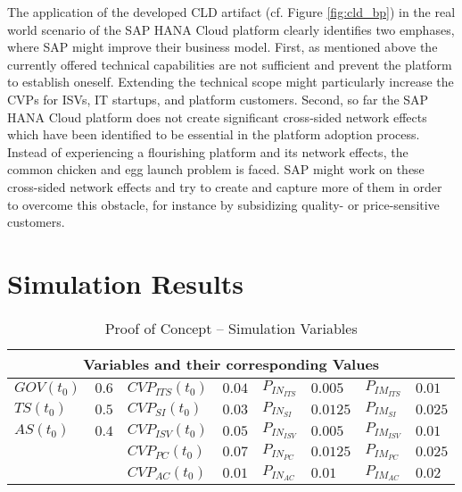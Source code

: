 The application of the developed \ac{CLD} artifact (cf. Figure \ref{fig:cld_bp}) in the real world scenario of the SAP HANA Cloud platform clearly identifies two emphases, where SAP might improve their business model. First, as mentioned above the currently offered technical capabilities are not sufficient and prevent the platform to establish oneself. Extending the technical scope might particularly increase the \acp{CVP} for \acp{ISV}, \ac{IT} startups, and platform customers. Second, so far the SAP HANA Cloud platform does not create significant cross-sided network effects which have been identified to be essential in the platform adoption process. Instead of experiencing a flourishing platform and its network effects, the common chicken and egg launch problem is faced. SAP might work on these cross-sided network effects and try to create and capture more of them in order to overcome this obstacle, for instance by subsidizing quality- or price-sensitive customers.

\section{Simulation Results}\label{ch:poc:sr}



\begin{table}[t]
	\centering
	\begin{tabular}{llllllll}
		\toprule 
		\multicolumn{8}{c}{\footnotesize \textbf{Variables and their corresponding Values}} \\ \midrule
		\footnotesize $GOV(t_0)$ & \footnotesize $0.6$ & \footnotesize $CVP_{ITS}(t_0)$ & \footnotesize $0.04$ & \footnotesize $P_{IN_{ITS}}$ & \footnotesize $0.005$ & \footnotesize $P_{IM_{ITS}}$ & \footnotesize $0.01$ \\
		\footnotesize $TS(t_0)$ & \footnotesize $0.5$ & \footnotesize $CVP_{SI}(t_0)$ & \footnotesize $0.03$ & \footnotesize $P_{IN_{SI}}$ & \footnotesize $0.0125$ & \footnotesize $P_{IM_{SI}}$ & \footnotesize $0.025$ \\
		\footnotesize $AS(t_0)$ & \footnotesize $0.4$ & \footnotesize $CVP_{ISV}(t_0)$ & \footnotesize $0.05$ & \footnotesize $P_{IN_{ISV}}$ & \footnotesize $0.005$ & \footnotesize $P_{IM_{ISV}}$ & \footnotesize $0.01$ \\
		& & \footnotesize $CVP_{PC}(t_0)$ & \footnotesize $0.07$ & \footnotesize $P_{IN_{PC}}$ & \footnotesize $0.0125$ & \footnotesize $P_{IM_{PC}}$ & \footnotesize $0.025$ \\
		& & \footnotesize $CVP_{AC}(t_0)$ & \footnotesize $0.01$ & \footnotesize $P_{IN_{AC}}$ & \footnotesize $0.01$ & \footnotesize $P_{IM_{AC}}$ & \footnotesize $0.02$ \\ \bottomrule
	\end{tabular}
	\caption{Proof of Concept -- Simulation Variables}
	\label{tab:mvar:sap}
\end{table}

